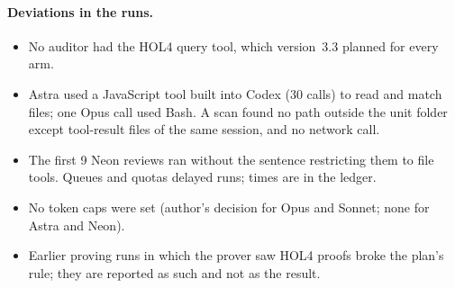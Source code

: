 \documentclass[11pt,a4paper]{article}
\begin{document}
\paragraph{Deviations in the runs.}
\begin{itemize}
\item No auditor had the HOL4 query tool, which version~3.3 planned for every arm.
\item Astra used a JavaScript tool built into Codex (30 calls) to read and match files; one Opus call used Bash. A scan found no path outside the unit folder except tool-result files of the same session, and no network call.
\item The first 9 Neon reviews ran without the sentence restricting them to file tools. Queues and quotas delayed runs; times are in the ledger.
\item No token caps were set (author's decision for Opus and Sonnet; none for Astra and Neon).
\item Earlier proving runs in which the prover saw HOL4 proofs broke the plan's rule; they are reported as such and not as the result.
\end{itemize}
\end{document}
